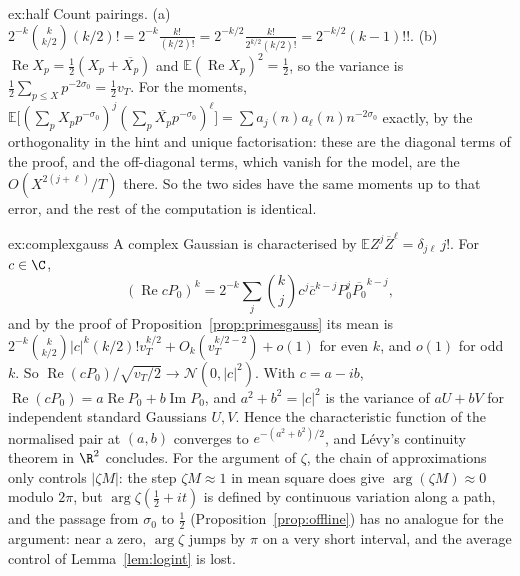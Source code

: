 \begin{solution}{ex:half}
\idea Count pairings.
\writeup (a) $2^{-k}\binom k{k/2}(k/2)!=2^{-k}\frac{k!}{(k/2)!}=2^{-k/2}\frac{k!}{2^{k/2}(k/2)!}=2^{-k/2}(k-1)!!$. (b) $\operatorname{Re}X_p=\frac12(X_p+\overline{X_p})$ and $\mathbb E(\operatorname{Re}X_p)^2=\frac12$, so the variance is $\frac12\sum_{p\le X}p^{-2\sigma_0}=\frac12v_T$. For the moments, $\mathbb E\bigl[(\sum_pX_pp^{-\sigma_0})^j(\sum_p\overline{X_p}p^{-\sigma_0})^\ell\bigr]=\sum a_j(n)a_\ell(n)n^{-2\sigma_0}$ exactly, by the orthogonality in the hint and unique factorisation: these are the diagonal terms of the proof, and the off-diagonal terms, which vanish for the model, are the $O(X^{2(j+\ell)}/T)$ there. So the two sides have the same moments up to that error, and the rest of the computation is identical.
\end{solution}

\begin{solution}{ex:complexgauss}
\idea A complex Gaussian is characterised by $\mathbb EZ^j\overline Z^\ell=\delta_{j\ell}\,j!$.
\writeup For $c\in\C$,
\[
(\operatorname{Re}cP_0)^k=2^{-k}\sum_j\binom kjc^j\overline c^{k-j}P_0^j\overline{P_0}^{k-j},
\]
and by the proof of Proposition~\ref{prop:primesgauss} its mean is $2^{-k}\binom k{k/2}|c|^k(k/2)!v_T^{k/2}+O_k(v_T^{k/2-2})+o(1)$ for even $k$, and $o(1)$ for odd $k$. So $\operatorname{Re}(cP_0)/\sqrt{v_T/2}\to\mathcal N(0,|c|^2)$. With $c=a-ib$, $\operatorname{Re}(cP_0)=a\operatorname{Re}P_0+b\operatorname{Im}P_0$, and $a^2+b^2=|c|^2$ is the variance of $aU+bV$ for independent standard Gaussians $U,V$. Hence the characteristic function of the normalised pair at $(a,b)$ converges to $e^{-(a^2+b^2)/2}$, and Lévy's continuity theorem in $\R^2$ concludes. For the argument of $\zeta$, the chain of approximations only controls $|\zeta M|$: the step $\zeta M\approx1$ in mean square does give $\arg(\zeta M)\approx0$ modulo $2\pi$, but $\arg\zeta(\frac12+it)$ is defined by continuous variation along a path, and the passage from $\sigma_0$ to $\frac12$ (Proposition~\ref{prop:offline}) has no analogue for the argument: near a zero, $\arg\zeta$ jumps by $\pi$ on a very short interval, and the average control of Lemma~\ref{lem:logint} is lost.
\end{solution}

